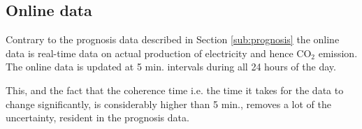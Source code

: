\documentclass[Main]{subfiles}
\begin{document}

	\subsection{Online data} %
	\label{sub:online_data}
		Contrary to the prognosis data described in Section \ref{sub:prognosis} the online data is real-time data on actual production of electricity and hence CO$_2$ emission.
		The online data is updated at 5 min. intervals during all 24 hours of the day.

		This, and the fact that the coherence time i.e. the time it takes for the data to change significantly, is considerably higher than 5 min., removes a lot of the uncertainty, resident in the prognosis data.


\end{document}
